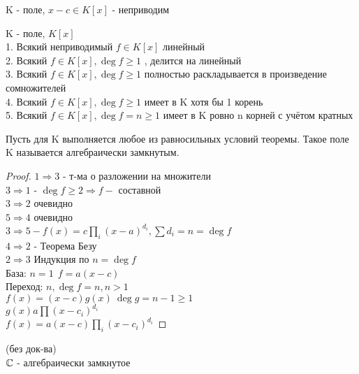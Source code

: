K - поле, $ x-c \in K[x] $ - неприводим \\
\begin{theorem}
	K - поле, $K[x]$ \\
	1. Всякий неприводимый $ f \in K[x] $ линейный \\
	2. Всякий $ f \in K[x], \deg f \geq 1$ , делится на линейный \\
	3. Всякий $ f \in K[x], \deg f \geq 1$ полностью раскладывается в произведение сомножителей \\
	4. Всякий $ f \in K[x], \deg f \geq 1 $ имеет в K хотя бы 1 корень \\
	5. Всякий $ f \in K[x], \deg f = n \geq 1 $ имеет в K ровно n корней с учётом кратных \\
	\begin{definition}
		Пусть для K выполняется любое из равносильных условий теоремы. Такое поле K называется алгебраически замкнутым.
	\end{definition}
	\begin{proof}
		$ 1 \Rightarrow 3 $ - т-ма о разложении на множители \\
		$ 3 \Rightarrow 1 $ - $ \deg f \geq 2 \Rightarrow f - $ составной \\
		$ 3 \Rightarrow 2 $ очевидно \\
		$ 5 \Rightarrow 4 $ очевидно \\
		$ 3 \Rightarrow 5 - f(x) = c \prod_i (x-a)^{d_i}, \sum d_i = n = \deg f$ \\
		$ 4 \Rightarrow 2 $ - Теорема Безу \\
		$  2 \Rightarrow 3 $ Индукция по $ n = \deg f $ \\
		База: $n = 1 \ \ f = a(x-c) $ \\
		Переход: $ n, \deg f = n, n > 1 $ \\
		$ f(x) = (x-c) g(x)  \ \deg g = n - 1 \geq 1 $ \\
		$ g(x) a \prod (x - c_i)^{d_i} $ \\
		$ f(x) = a (x-c) \prod_i (x - c_i)^{d_i} $ 
	\end{proof}
\end{theorem}
\begin{theorem} (без док-ва) \\
	$ \mathbb{C} $  - алгебраически замкнутое
\end{theorem}


